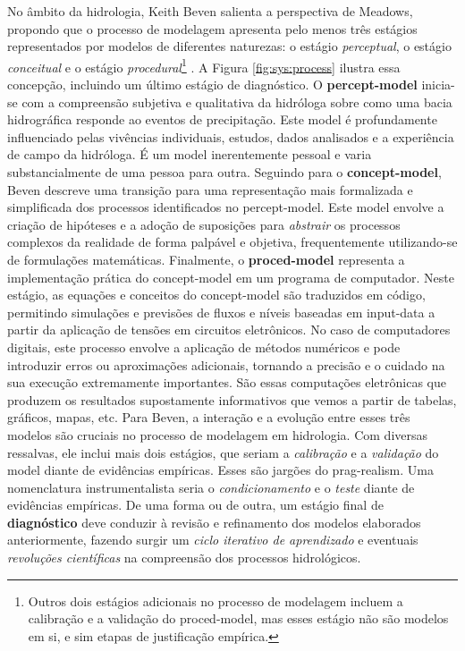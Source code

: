 \documentclass[./main.tex]{subfiles}
\begin{document}
\par No âmbito da hidrologia, Keith Beven salienta a perspectiva de Meadows, propondo que o processo de modelagem apresenta pelo menos três estágios representados por modelos de diferentes naturezas: o estágio \textit{perceptual}, o estágio \textit{conceitual} e o estágio \textit{procedural}\footnote{Outros dois estágios adicionais no processo de modelagem incluem a calibração e a validação do \gls{proced-model}, mas esses estágio não são modelos em si, e sim etapas de justificação empírica.} \cite{beven2011}. A Figura \ref{fig:sys:process} ilustra essa concepção, incluindo um último estágio de diagnóstico. O \textbf{\gls{percept-model}} inicia-se com a compreensão subjetiva e qualitativa da hidróloga sobre como uma bacia hidrográfica responde ao eventos de precipitação. Este \gls{model} é profundamente influenciado pelas vivências individuais, estudos, dados analisados e a experiência de campo da hidróloga. É um \gls{model} inerentemente pessoal e varia substancialmente de uma pessoa para outra. Seguindo para o \textbf{\gls{concept-model}}, Beven descreve uma transição para uma representação mais formalizada e simplificada dos processos identificados no \gls{percept-model}. Este \gls{model} envolve a criação de hipóteses e a adoção de suposições para \textit{abstrair} os processos complexos da realidade de forma palpável e objetiva, frequentemente utilizando-se de formulações matemáticas. Finalmente, o \textbf{\gls{proced-model}} representa a implementação prática do \gls{concept-model} em um programa de computador. Neste estágio, as equações e conceitos do \gls{concept-model} são traduzidos em código, permitindo simulações e previsões de fluxos e níveis baseadas em \gls{input-data} a partir da aplicação de tensões em circuitos eletrônicos. No caso de computadores digitais, este processo envolve a aplicação de métodos numéricos e pode introduzir erros ou aproximações adicionais, tornando a precisão e o cuidado na sua execução extremamente importantes. São essas computações eletrônicas que produzem os resultados supostamente informativos que vemos a partir de tabelas, gráficos, mapas, etc. Para Beven, a interação e a evolução entre esses três modelos são cruciais no processo de modelagem em hidrologia. Com diversas ressalvas, ele inclui mais dois estágios, que seriam a \textit{calibração} e a \textit{validação} do \gls{model} diante de evidências empíricas.  Esses são jargões do \gls{prag-realism}. Uma nomenclatura instrumentalista seria o \textit{condicionamento} e o \textit{teste} diante de evidências empíricas. De uma forma ou de outra, um estágio final de \textbf{diagnóstico} deve conduzir à revisão e refinamento dos modelos elaborados anteriormente, fazendo surgir um \textit{ciclo iterativo de aprendizado} e eventuais \textit{revoluções científicas} na compreensão dos processos hidrológicos.
\end{document}

